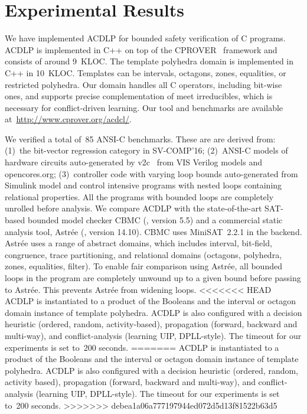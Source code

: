 \section{Experimental Results}
%
We have implemented ACDLP for bounded safety verification of C programs.  
ACDLP is implemented in C++ on top of the
\textsc{CPROVER}~\cite{cprover} framework and consists of around 9~KLOC. 
The template polyhedra domain is implemented in C++ in 10~KLOC.  Templates
can be intervals, octagons, zones, equalities, or restricted polyhedra.  Our
domain handles all C operators, including bit-wise ones, and supports
precise complementation of meet irreducibles, which is necessary for
conflict-driven learning.  Our tool and benchmarks are available 
at~\url{http://www.cprover.org/acdcl/}.
%


We verified a total of~85 ANSI-C benchmarks.  These are are derived from:
(1)~the bit-vector regression category in SV-COMP'16; (2)~ANSI-C models of
hardware circuits auto-generated by v2c~\cite{mtk2016} from VIS Verilog
models and opencores.org; (3)~controller code with varying loop bounds 
auto-generated from Simulink model and control 
intensive programs with nested loops containing relational properties. 
All the programs with bounded loops are completely unrolled before
analysis.  We compare ACDLP with the state-of-the-art SAT-based bounded model checker
CBMC (\cite{cbmc}, version 5.5) and a commercial static analysis tool,
Astr{\'e}e (\cite{astree}, version 14.10).  CBMC uses MiniSAT~2.2.1 in the
backend.  Astr{\'e}e uses a range of abstract domains, which includes
interval, bit-field, congruence, trace partitioning, and relational domains
(octagons, polyhedra, zones, equalities, filter).  To enable fair comparison
using Astr{\'e}e, all bounded loops in the program are completely unwound up
to a given bound before passing to Astr{\'e}e.  This prevents Astr{\'e}e
from widening loops.
%
<<<<<<< HEAD
ACDLP is instantiated to a product of the Booleans and the interval or
octagon domain instance of template polyhedra.  ACDLP is also
configured with a decision heuristic (ordered, random,
activity-based), propagation (forward, backward and multi-way), and
conflict-analysis (learning UIP, DPLL-style).  The timeout for our
experiments is set to~200 seconds.
=======
ACDLP is instantiated to a product of the Booleans
and the interval or octagon domain instance of template polyhedra.  ACDLP is
also configured with a decision heuristic (ordered, random, activity
based), propagation (forward, backward and multi-way), and conflict-analysis
(learning UIP, DPLL-style).  The timeout for our experiments is set to~200
seconds.  
>>>>>>> debea1a06a777197944ed072d5d13f81522b63d5
%

